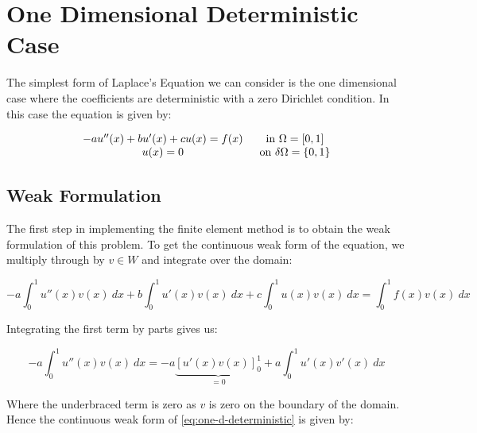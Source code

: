 \chapter{One Dimensional Deterministic Case}

The simplest form of Laplace's Equation we can consider is the one dimensional case where
the coefficients are deterministic with a zero Dirichlet condition. In this case
the equation is given by:

\begin{equation}
\begin{array}{c c}\label{eq:one-d-deterministic}
	-au''(x) + bu'(x) + cu(x) = f(x)\, & \text{ in } \Omega = [0, 1] \\
      u(x) = 0\, & \text{ on } \delta\Omega = \{0, 1\}
\end{array}
\end{equation}


\section{Weak Formulation}


The first step in implementing the finite element method is to obtain the weak formulation of this
problem. To get the continuous weak form of the equation, we multiply through by $v \in W$ and integrate
over the domain:

\begin{equation}
	-a\int_0^1{u''(x)v(x)\ dx} + b\int_0^1{u'(x)v(x)\ dx} + c\int_0^1{u(x)v(x)\ dx} = 
    \int_0^1{f(x)v(x)\ dx}
\end{equation}

Integrating the first term by parts gives us:

\begin{equation}
	-a\int_0^1{u''(x)v(x)\ dx} = -a\underbrace{[ u'(x)v(x) ]_0^1}_{ = 0}
    	+ a\int_0^1{u'(x)v'(x)\ dx}
\end{equation}

Where the underbraced term is zero as $v$ is zero on the boundary of the domain. Hence the
continuous weak form of \ref{eq:one-d-deterministic} is given by:

